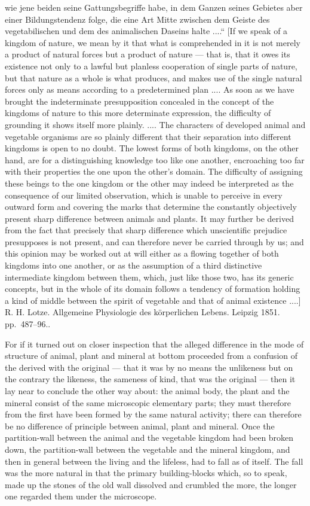 \documentclass[12pt,a4paper]{book}
\begin{document}
{wie jene beiden seine Gattungsbegriffe habe, in dem Ganzen seines Gebietes
aber einer Bildungstendenz folge, die eine Art Mitte zwischen dem Geiste
des vegetabilischen und dem des animalischen Daseins halte ....“ [If we speak
of a kingdom of nature, we mean by it that what is comprehended in it is not
merely a product of natural forces but a product of nature --- that is, that it
owes its existence not only to a lawful but planless cooperation of single
parts of nature, but that nature as a whole is what produces, and makes use of
the single natural forces only as means according to a predetermined plan ....
As soon as we have brought the indeterminate presupposition concealed in the
concept of the kingdoms of nature to this more determinate expression, the
difficulty of grounding it shows itself more plainly. .... The characters of
developed animal and vegetable organisms are so plainly different that their
separation into different kingdoms is open to no doubt. The lowest forms of
both kingdoms, on the other hand, are for a distinguishing knowledge too like
one another, encroaching too far with their properties the one upon the other's
domain. The difficulty of assigning these beings to the one kingdom or the
other may indeed be interpreted as the consequence of our limited observation,
which is unable to perceive in every outward form and covering the marks that
determine the constantly objectively present sharp difference between animals
and plants. It may further be derived from the fact that precisely that sharp
difference which unscientific prejudice presupposes is not present, and can
therefore never be carried through by us; and this opinion may be worked out at
will either as a flowing together of both kingdoms into one another, or as the
assumption of a third distinctive intermediate kingdom between them, which,
just like those two, has its generic concepts, but in the whole of its domain
follows a tendency of formation holding a kind of middle between the spirit of
vegetable and that of animal existence ....] R. H. Lotze. Allgemeine
Physiologie des körperlichen Lebens. Leipzig 1851. pp.~487--96.}.

For if it turned out on closer inspection that the alleged difference in the
mode of structure of animal, plant and mineral at bottom proceeded from a
confusion of the derived with the original --- that it was by no means the
unlikeness but on the contrary the likeness, the sameness of kind, that was the
original --- then it lay near to conclude the other way about: the animal body,
the plant and the mineral consist of the same microscopic elementary parts;
they must therefore from the first have been formed by the same natural
activity; there can therefore be no difference of principle between animal,
plant and mineral. Once the partition-wall between the animal and the vegetable
kingdom had been broken down, the partition-wall between the vegetable and the
mineral kingdom, and then in general between the living and the lifeless, had
to fall as of itself. The fall was the more natural in that the primary
building-blocks which, so to speak, made up the stones of the old wall
dissolved and crumbled the more, the longer one regarded them under the
microscope.
\end{document}

